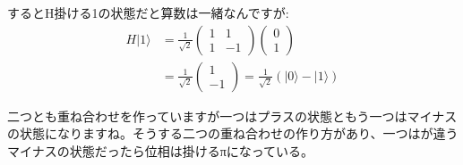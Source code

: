 
するとH掛ける1の状態だと算数は一緒なんですが:
\begin{equation}
\begin{aligned}
H|1\rangle &=\frac{1}{\sqrt{2}}\left(\begin{array}{cc}
1 & 1 \\
1 & -1
\end{array}\right)\left(\begin{array}{l}
0 \\
1
\end{array}\right) \\
&=\frac{1}{\sqrt{2}}\left(\begin{array}{c}
1 \\
-1
\end{array}\right)=\frac{1}{\sqrt{2}}(|0\rangle-|1\rangle)
\end{aligned}
\end{equation}


二つとも重ね合わせを作っていますが一つはプラスの状態ともう一つはマイナスの状態になりますね。そうする二つの重ね合わせの作り方があり、一つはが違う
マイナスの状態だったら位相は掛けるπになっている。
